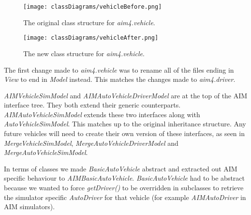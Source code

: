 \begin{figure}[htb]
\texttt{[image: classDiagrams/vehicleBefore.png]}
\caption{The original class structure for \emph{aim4.vehicle}.}
\label{fig:vehicleBefore}
\end{figure}

\begin{figure}[htb]
\texttt{[image: classDiagrams/vehicleAfter.png]}
\caption{The new class structure for \emph{aim4.vehicle}.}
\label{fig:vehicleAfter}
\end{figure}

The first change made to \emph{aim4.vehicle} was to rename all of the files ending in \emph{View} to end in \emph{Model} instead. This matches the changes made to \emph{aim4.driver}.

\emph{AIMVehicleSimModel} and \emph{AIMAutoVehicleDriverModel} are at the top of the AIM interface tree. They both extend their generic counterparts. \emph{AIMAutoVehicleSimModel} extends these two interfaces along with \emph{AutoVehicleSimModel}. This matches up to the original inheritance structure. Any future vehicles will need to create their own version of these interfaces, as seen in \emph{MergeVehicleSimModel}, \emph{MergeAutoVehicleDriverModel} and \emph{MergeAutoVehicleSimModel}. 

In terms of classes we made \emph{BasicAutoVehicle} abstract and extracted out AIM specific behaviour to \emph{AIMBasicAutoVehicle}. \emph{BasicAutoVehicle} had to be abstract because we wanted to force \emph{getDriver()} to be overridden in subclasses to retrieve the simulator specific \emph{AutoDriver} for that vehicle (for example \emph{AIMAutoDriver} in AIM simulators). 


